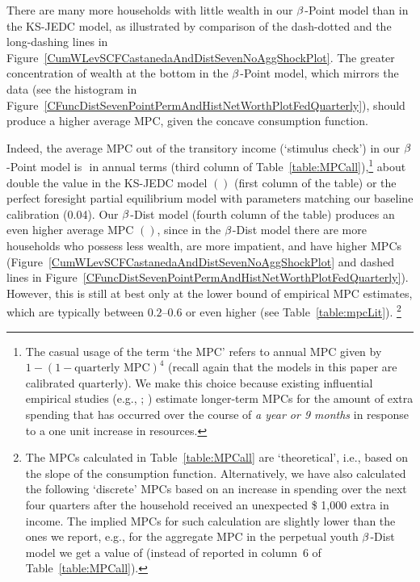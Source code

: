 \documentclass[12pt,titlepage]{econtex}
\begin{document}
There are many more households with little wealth in our $\beta$-Point model than in the KS-JEDC model, as illustrated by comparison of the dash-dotted and the long-dashing lines in Figure~\ref{CumWLevSCFCastanedaAndDistSevenNoAggShockPlot}. The greater concentration of wealth at the bottom in the $\beta$-Point model, which mirrors the data (see the histogram in Figure~\ref{CFuncDistSevenPointPermAndHistNetWorthPlotFedQuarterly}), should produce a higher average MPC, given the concave consumption function.

Indeed, the average MPC out of the transitory income (`stimulus check') in our $\beta$-Point model is $  $ in annual terms (third column of Table~\ref{table:MPCall}),\footnote{The casual usage of the term `the MPC' refers to annual MPC given by $1-(1-\text{quarterly MPC})^4$ (recall again that the models in this paper are calibrated quarterly).  We make this choice because existing influential empirical studies (e.g., \citet{souleles:taxrefunds}; \citet{jpsTax}) estimate longer-term MPCs for the amount of extra spending that has occurred over the course of \emph{a year or 9 months} in response to a one unit increase in resources.}  about double the value in the KS-JEDC model $(  )$ (first column of the table) or the perfect foresight partial equilibrium model with parameters matching our baseline calibration (0.04). Our $\beta$-Dist model (fourth column of the table) produces an even higher average MPC $(  )$, since in the $\beta$-Dist model there are more households who possess less wealth, are more impatient, and have higher MPCs (Figure~\ref{CumWLevSCFCastanedaAndDistSevenNoAggShockPlot} and dashed lines in Figure~\ref{CFuncDistSevenPointPermAndHistNetWorthPlotFedQuarterly}). However, this is still at best only at the lower bound of empirical MPC estimates, which are typically between $0.2$--$0.6$ or even higher (see Table~\ref{table:mpcLit}).%
\footnote{The MPCs calculated in Table~\ref{table:MPCall} are `theoretical', i.e., based on the slope of the consumption function. Alternatively, we have also calculated the following `discrete' MPCs based on an increase in spending over the next four quarters after the household received an unexpected \$ 1,000 extra in income. The implied MPCs for such calculation are slightly lower than the ones we report, e.g., for the aggregate MPC in the perpetual youth $\beta$-Dist model we get a value of  (instead of  reported in column~6 of Table~\ref{table:MPCall}).}
\end{document}

